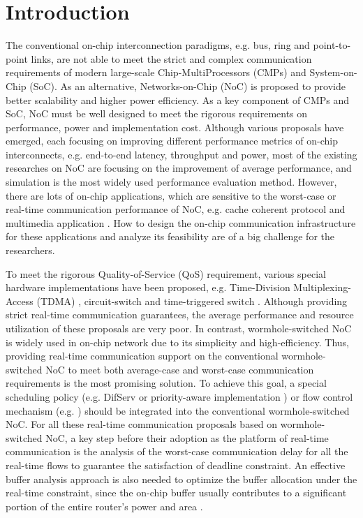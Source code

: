 \documentclass[10pt,journal]{IEEEtran}
\begin{document}
\section{Introduction}
The conventional on-chip interconnection paradigms, e.g. bus, ring and point-to-point links, are not able to meet the strict and complex communication requirements of modern large-scale Chip-MultiProcessors (CMPs) and System-on-Chip (SoC). As an alternative, Networks-on-Chip (NoC) is proposed to provide better scalability and higher power efficiency. As a key component of CMPs and SoC, NoC must be well designed to meet the rigorous requirements on performance, power and implementation cost. Although various proposals have emerged, each focusing on improving different performance metrics of on-chip interconnects, e.g. end-to-end latency, throughput and power, most of the existing researches on NoC are focusing on the improvement of average performance, and simulation is the most widely used performance evaluation method. However, there are lots of on-chip applications, which are sensitive to the worst-case or real-time communication performance of NoC, e.g. cache coherent protocol \cite{Bolotin2007} and multimedia application \cite{ostermann2004video}. How to design the on-chip communication infrastructure for these applications and analyze its feasibility are of a big challenge for the researchers.

To meet the rigorous Quality-of-Service (QoS) requirement, various special hardware implementations have been proposed, e.g. Time-Division Multiplexing-Access (TDMA) \cite{GoDR05}, circuit-switch \cite{6628254} and time-triggered switch \cite{4617280}. Although providing strict real-time communication guarantees, the average performance and resource utilization of these proposals are very poor. In contrast, wormhole-switched NoC is widely used in on-chip network due to its simplicity and high-efficiency. Thus, providing real-time communication support on the conventional wormhole-switched NoC to meet both average-case and worst-case communication requirements is the most promising solution. To achieve this goal, a special scheduling policy (e.g. DifServ \cite{1411140} or priority-aware implementation \cite{Shi:2008:RCA:1397757.1397996}\cite{708526}\cite{627905}) or flow control mechanism (e.g. \cite{Li199649}\cite{707545}) should be integrated into the conventional wormhole-switched NoC. For all these real-time communication proposals based on wormhole-switched NoC, a key step before their adoption as the platform of real-time communication is the analysis of the worst-case communication delay for all the real-time flows to guarantee the satisfaction of deadline constraint. An effective buffer analysis approach is also needed to optimize the buffer allocation under the real-time constraint, since the on-chip buffer usually contributes to a significant portion of the entire router's power and area \cite{pkundu}\cite{5507566}.
\end{document}
